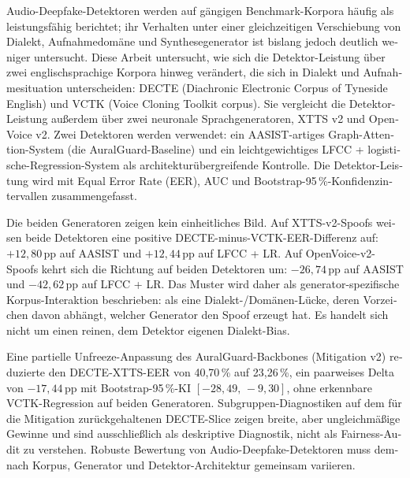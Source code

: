 \cleardoubleoddpage%
\begin{otherlanguage}{ngerman}
\begin{abstract*}
Audio-Deepfake-Detektoren werden auf g\"angigen Benchmark-Korpora
h\"aufig als leistungsf\"ahig berichtet; ihr Verhalten unter einer
gleichzeitigen Verschiebung von Dialekt, Aufnahmedom\"ane und
Synthesegenerator ist bislang jedoch deutlich weniger untersucht.
Diese Arbeit untersucht, wie sich die Detektor-Leistung \"uber
zwei englischsprachige Korpora hinweg ver\"andert, die sich in
Dialekt und Aufnahmesituation unterscheiden: DECTE
(Diachronic Electronic Corpus of Tyneside English) und VCTK
(Voice Cloning Toolkit corpus). Sie vergleicht die
Detektor-Leistung au{\ss}erdem \"uber zwei neuronale
Sprachgeneratoren, XTTS v2 und OpenVoice v2. Zwei Detektoren
werden verwendet: ein AASIST-artiges Graph-Attention-System
(die AuralGuard-Baseline) und ein leichtgewichtiges
LFCC + logistische-Regression-System als architektur\"ubergreifende
Kontrolle. Die Detektor-Leistung wird mit Equal Error Rate
(EER), AUC und Bootstrap-95\,\%-Konfidenzintervallen
zusammengefasst.

Die beiden Generatoren zeigen kein einheitliches Bild. Auf
XTTS-v2-Spoofs weisen beide Detektoren eine positive
DECTE-minus-VCTK-EER-Differenz auf: $+12{,}80$\,pp auf AASIST
und $+12{,}44$\,pp auf LFCC + LR. Auf OpenVoice-v2-Spoofs
kehrt sich die Richtung auf beiden Detektoren um:
$-26{,}74$\,pp auf AASIST und $-42{,}62$\,pp auf LFCC + LR.
Das Muster wird daher als generator-spezifische Korpus-Interaktion
beschrieben: als eine Dialekt-/Dom\"anen-L\"ucke, deren Vorzeichen
davon abh\"angt, welcher Generator den Spoof erzeugt hat. Es
handelt sich nicht um einen reinen, dem Detektor eigenen
Dialekt-Bias.

Eine partielle Unfreeze-Anpassung des AuralGuard-Backbones
(Mitigation v2) reduzierte den DECTE-XTTS-EER von
40{,}70\,\% auf 23{,}26\,\%, ein paarweises Delta von
$-17{,}44$\,pp mit Bootstrap-95\,\%-KI $[-28{,}49,\,-9{,}30]$,
ohne erkennbare VCTK-Regression auf beiden Generatoren.
Subgruppen-Diagnostiken auf dem f\"ur die Mitigation
zur\"uckgehaltenen DECTE-Slice zeigen breite, aber
ungleichm\"a{\ss}ige Gewinne und sind ausschlie{\ss}lich als
deskriptive Diagnostik, nicht als Fairness-Audit zu verstehen.
Robuste Bewertung von Audio-Deepfake-Detektoren muss
demnach Korpus, Generator und Detektor-Architektur gemeinsam
variieren.
\end{abstract*}
\end{otherlanguage}

